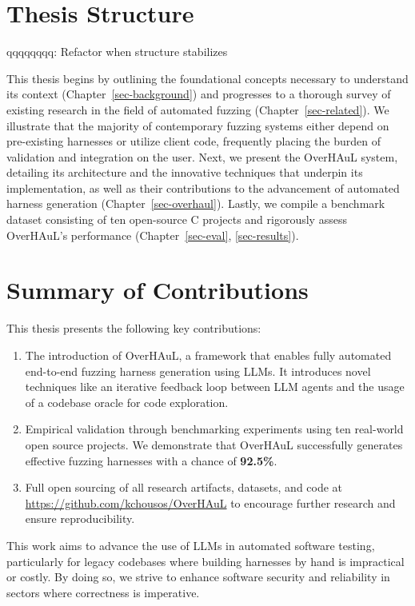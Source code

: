 \documentclass[
  a4paper,
]{scrreprt}
\providecommand{\tightlist}{%
  \setlength{\itemsep}{0pt}\setlength{\parskip}{0pt}}
\theoremstyle{definition}
\theoremstyle{remark}
\begin{document}
\section{Thesis Structure}\label{thesis-structure}

qqqqqqqq: Refactor when structure stabilizes

This thesis begins by outlining the foundational concepts necessary to
understand its context (Chapter~\ref{sec-background}) and progresses to
a thorough survey of existing research in the field of automated fuzzing
(Chapter~\ref{sec-related}). We illustrate that the majority of
contemporary fuzzing systems either depend on pre-existing harnesses or
utilize client code, frequently placing the burden of validation and
integration on the user. Next, we present the OverHAuL system, detailing
its architecture and the innovative techniques that underpin its
implementation, as well as their contributions to the advancement of
automated harness generation (Chapter~\ref{sec-overhaul}). Lastly, we
compile a benchmark dataset consisting of ten open-source C projects and
rigorously assess OverHAuL's performance
(Chapter~\ref{sec-eval}, \ref{sec-results}).

\section{Summary of Contributions}\label{summary-of-contributions}

This thesis presents the following key contributions:

\begin{enumerate}
\def\labelenumi{\arabic{enumi}.}
\tightlist
\item
  The introduction of OverHAuL, a framework that enables fully automated
  end-to-end fuzzing harness generation using LLMs. It introduces novel
  techniques like an iterative feedback loop between LLM agents and the
  usage of a codebase oracle for code exploration.
\item
  Empirical validation through benchmarking experiments using ten
  real-world open source projects. We demonstrate that OverHAuL
  successfully generates effective fuzzing harnesses with a chance of
  \textbf{92.5\%}.
\item
  Full open sourcing of all research artifacts, datasets, and code at
  \url{https://github.com/kchousos/OverHAuL} to encourage further
  research and ensure reproducibility.
\end{enumerate}

This work aims to advance the use of LLMs in automated software testing,
particularly for legacy codebases where building harnesses by hand is
impractical or costly. By doing so, we strive to enhance software
security and reliability in sectors where correctness is imperative.
\end{document}
